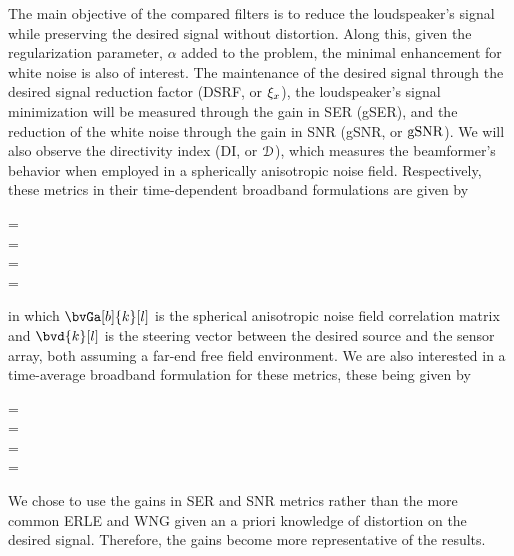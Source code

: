 The main objective of the compared filters is to reduce the loudspeaker's signal while preserving the desired signal without distortion. Along this, given the regularization parameter, $\alpha$ added to the problem, the minimal enhancement for white noise is also of interest. The maintenance of the desired signal through the desired signal reduction factor (DSRF, or $\xi_{x}$), the loudspeaker's signal minimization will be measured through the gain in SER (gSER), and the reduction of the white noise through the gain in SNR (gSNR, or $\text{gSNR}$). We will also observe the directivity index (DI, or $\mathcal{D}$), which measures the beamformer's behavior when employed in a spherically anisotropic noise field. Respectively, these metrics in their time-dependent broadband formulations are given by
\begin{subgather}
	\dsrf[l] =  \\
	\gser[l] =  \cdot {}\\
	\gsnr[l] =  \cdot {} \\
	\di[l] = 
\end{subgather}
in which $\bvGa[b]{k}[l]$ is the spherical anisotropic noise field correlation matrix \cite{habets_generating_2007} and $\bvd{k}[l]$ is the steering vector between the desired source and the sensor array, both assuming a far-end free field environment. We are also interested in a time-average broadband formulation for these metrics, these being given by
\begin{subgather}
	\dsrf =  \\
	\gser =  \cdot {} \\
	\gsnr =  \cdot {} \\
	\di = 
\end{subgather}

We chose to use the gains in SER and SNR metrics rather than the more common ERLE and WNG \cite{wada_enhancement_2012} given an a priori knowledge of distortion on the desired signal. Therefore, the gains become more representative of the results.

